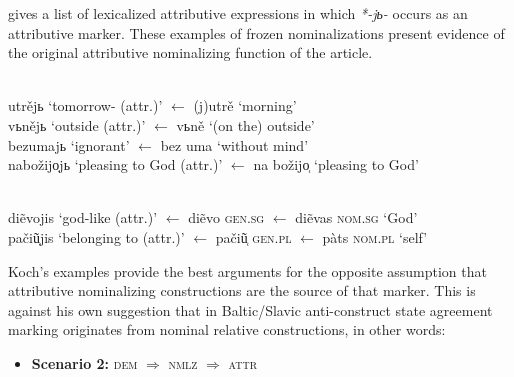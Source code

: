 \citet[467–468]{koch1999} gives a list of lexicalized attributive expressions in which \textit{*-jь-} occurs as an attributive marker. These examples of frozen nominalizations present evidence of the original attributive nominalizing function of the  article. 
\begin{exe}
\ex
\begin{xlist}
\begin{xlist}
\\
	utrějь {\upshape ‘tomorrow- (attr.)’ $\leftarrow$} (j)utrě {\upshape ‘morning’}
\\
	vьnějь {\upshape ‘outside (attr.)’ $\leftarrow$} vьně {\upshape ‘(on the) outside’}\\
	bezumajь {\upshape ‘ignorant’ $\leftarrow$} bez uma {\upshape ‘without mind’}
\\
	nabožijo̜jь {\upshape ‘pleasing to God (attr.)’ $\leftarrow$} na božijo̜ {\upshape ‘pleasing to God’}
\end{xlist}
\begin{xlist}
\\
	di\~evojis {\upshape ‘god-like (attr.)’ $\leftarrow$} di\~evo {\upshape \textsc{gen.sg} $\leftarrow$} di\~evas {\upshape \textsc{nom.sg} ‘God’}
\\
	pači\~u̜jis {\upshape ‘belonging to (attr.)’ $\leftarrow$} pači\~u̜ {\upshape \textsc{gen.pl} $\leftarrow$} pàts {\upshape \textsc{nom.pl} ‘self’}
\end{xlist}
\end{xlist}
\end{exe}

Koch's examples provide the best arguments for the opposite assumption that attributive nominalizing constructions are the source of that marker. This is against his own suggestion that in Baltic\slash{}Slavic anti\hyp{}construct state agreement marking originates from nominal relative constructions, in other words:
\begin{itemize}
\item \textbf{Scenario 2:} \textsc{dem $\Rightarrow$ nmlz $\Rightarrow$ attr}
\end{itemize}

